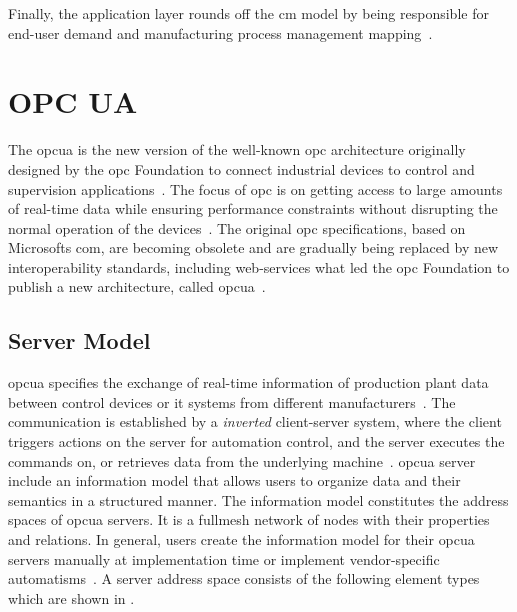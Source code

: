\documentclass[
a4paper,
twoside,
headsepline,
cleardoublepage=empty,
parskip=half,
draft=false
]{scrbook}
\begin{document}
			Finally, the application layer rounds off the \gls{cm} model by being responsible for end-user demand and manufacturing process management mapping~\cite{xu2012cloud}.

		\section{OPC UA} \label{sec:opc_ua}

			The \gls{opcua} is the new version of the well-known \gls{opc} architecture originally designed by the \gls{opc} Foundation to
			connect industrial devices to control and supervision applications~\cite{hadlich2006providing}. The focus of \gls{opc} is on getting access to large amounts of real-time data while ensuring performance constraints without disrupting the normal operation of the devices~\cite{candido2010soa}.
			The original \gls{opc} specifications, based on Microsofts \gls{com}, are becoming obsolete and are gradually being replaced by new interoperability standards, including web-services what led the \gls{opc} Foundation to publish a new architecture, called \gls{opcua}~\cite{hadlich2006providing}.

			\subsection{Server Model}\label{subsec:opc_ua_server_model}

				\gls{opcua} specifies the exchange of real-time information of production plant data between control devices or \gls{it} systems from different manufacturers~\cite{venkatesh2005validating}.
				The communication is established by a \textit{inverted} client-server system, where the client triggers actions on the server for automation control, and the server executes the commands on, or retrieves data from the underlying machine~\cite{imtiaz2013scalability}.
				\gls{opcua} server include an information model that allows users to organize data and their semantics in a structured manner.
				The information model constitutes the address spaces of \gls{opcua} servers.
				It is a fullmesh network of nodes with their properties and relations.
				In general, users create the information model for their \gls{opcua} servers manually at implementation time or implement vendor-specific automatisms~\cite{henssen2014online}.
				A server address space consists of the following element types which are shown in .
\end{document}
